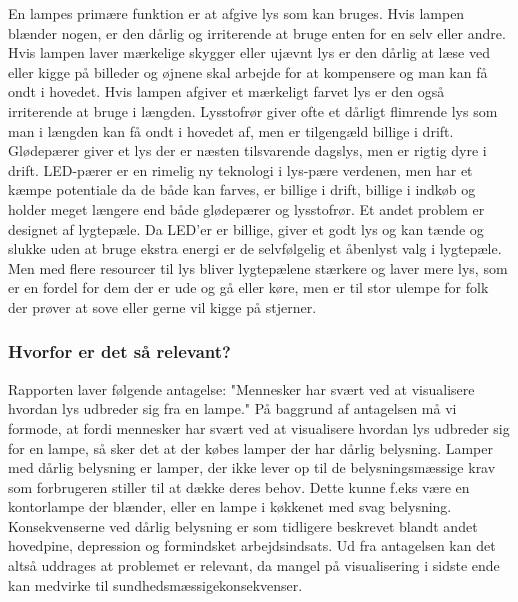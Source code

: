 En lampes primære funktion er at afgive lys som kan bruges. Hvis lampen blænder nogen, er den dårlig og irriterende at bruge enten for en selv eller andre. Hvis lampen laver mærkelige skygger eller ujævnt lys er den dårlig at læse ved eller kigge på billeder og øjnene skal arbejde for at kompensere og man kan få ondt i hovedet. Hvis lampen afgiver et mærkeligt farvet lys er den også irriterende at bruge i længden. Lysstofrør giver ofte et dårligt flimrende lys som man i længden kan få ondt i hovedet af, men er tilgengæld billige i drift. Glødepærer giver et lys der er næsten tilsvarende dagslys, men er rigtig dyre i drift\cite{videnskab_dk_led}. LED-pærer er en rimelig ny teknologi i lys-pære verdenen, men har et kæmpe potentiale da de både kan farves, er billige i drift, billige i indkøb og holder meget længere end både glødepærer og lysstofrør. Et andet problem er designet af lygtepæle. Da LED'er er billige, giver et godt lys og kan tænde og slukke uden at bruge ekstra energi er de selvfølgelig et åbenlyst valg i lygtepæle. Men med flere resourcer til lys bliver lygtepælene stærkere og laver mere lys, som er en fordel for dem der er ude og gå eller køre, men er til stor ulempe for folk der prøver at sove eller gerne vil kigge på stjerner\cite{dr_dk_lysforurening}.


\subsubsection{Hvorfor er det så relevant?}

Rapporten laver følgende antagelse: "Mennesker har svært ved at visualisere hvordan lys udbreder sig fra en lampe."
På baggrund af antagelsen må vi formode, at fordi mennesker har svært ved at visualisere hvordan lys udbreder sig for en lampe, så sker det at der købes lamper der har dårlig belysning. Lamper med dårlig belysning er lamper, der ikke lever op til de belysningsmæssige krav som forbrugeren stiller til at dække deres behov. Dette kunne f.eks være en kontorlampe der blænder, eller en lampe i køkkenet med svag belysning. Konsekvenserne ved dårlig belysning er som tidligere beskrevet blandt andet hovedpine, depression og formindsket arbejdsindsats. Ud fra antagelsen kan det altså uddrages at problemet er relevant, da mangel på visualisering i sidste ende kan medvirke til sundhedsmæssigekonsekvenser.